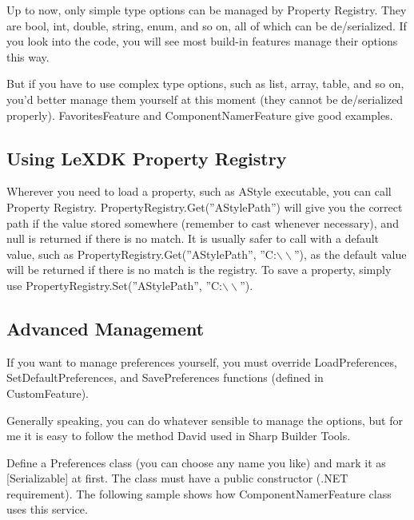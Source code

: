 
Up to now, only simple type options can be managed by Property Registry. They 
are bool, int, double, string, enum, and so on, all of which can be 
de/serialized. If you look into the code, you will see most build-in features 
manage their options this way.

But if you have to use complex type options, such as list, array, table, and so 
on, you'd better manage them yourself at this moment (they cannot be 
de/serialized properly). FavoritesFeature and ComponentNamerFeature give good 
examples.

\subsection{Using LeXDK Property Registry}

Wherever you need to load a property, such as AStyle executable, you can call 
Property Registry. PropertyRegistry.Get(''AStylePath'') will give you the 
correct path if the value stored somewhere (remember to cast whenever 
necessary), and null is returned if there is no match. It is usually safer to 
call with a default value, such as PropertyRegistry.Get(''AStylePath'', 
''C:$\backslash \backslash$''), as the default value will be returned if there 
is no match is the registry. To save a property, simply use 
PropertyRegistry.Set(''AStylePath'', ''C:$\backslash \backslash$'').

\subsection{Advanced Management}
If you want to manage preferences yourself, you must override LoadPreferences, 
SetDefaultPreferences, and SavePreferences functions (defined in CustomFeature).

Generally speaking, you can do whatever sensible to manage the options, but for 
me it is easy to follow the method David used in Sharp Builder Tools.

Define a Preferences class (you can choose any name you like) and mark it as 
[Serializable] at first. The class must have a public constructor (.NET 
requirement). The following sample shows how ComponentNamerFeature class uses 
this service.

